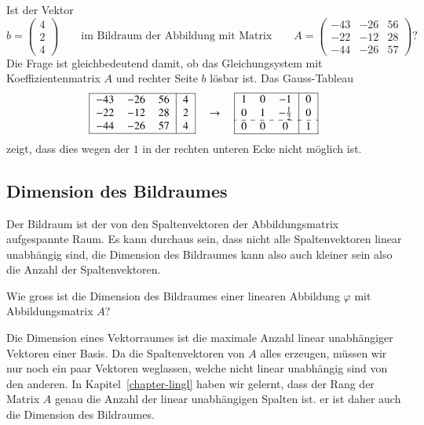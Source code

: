 \begin{beispiel}
Ist der Vektor
\[
b=\begin{pmatrix}4\\2\\4\end{pmatrix}
\qquad\text{im Bildraum der Abbildung mit Matrix}\qquad
A=
\begin{pmatrix}
  -43& -26&  56\\
  -22& -12&  28\\
  -44& -26&  57
\end{pmatrix}\text{?}
\]
Die Frage ist gleichbedeutend damit, ob das Gleichungsystem mit
Koeffizientenmatrix $A$ und rechter Seite $b$ lösbar ist.
Das Gauss-Tableau
\[
\begin{tabular}{|>{$}c<{$}>{$}c<{$}>{$}c<{$}|>{$}c<{$}|}
\hline
  -43& -26&  56&4\\
  -22& -12&  28&2\\
  -44& -26&  57&4\\
\hline
\end{tabular}
\quad\rightarrow\quad
\begin{tabular}{|>{$}c<{$}>{$}c<{$}>{$}c<{$}|>{$}c<{$}|}
\hline
   1&  0& -1&  0\\
   0&  1& -\frac12&   0\\
\hdashline
   0&  0&  0&  1\\
\hline
\end{tabular}
\]
zeigt, dass dies wegen der $1$ in der rechten unteren Ecke nicht möglich
ist.
\end{beispiel}

\subsection{Dimension des Bildraumes}
Der Bildraum ist der von den Spaltenvektoren der Abbildungsmatrix
aufgespannte Raum.
Es kann durchaus sein, dass nicht alle Spaltenvektoren linear unabhängig
sind, die Dimension des Bildraumes kann also auch kleiner sein also die
Anzahl der Spaltenvektoren.

\begin{aufgabe}
Wie gross ist die Dimension des Bildraumes einer linearen Abbildung
$\varphi$ mit Abbildungsmatrix $A$?
\end{aufgabe}
Die Dimension eines Vektorraumes ist die maximale Anzahl linear
unabhängiger Vektoren einer Basis.
Da die Spaltenvektoren von $A$ alles erzeugen, müssen wir nur noch
ein paar Vektoren weglassen, welche nicht linear unabhängig sind von
den anderen.
In Kapitel~\ref{chapter-lingl} haben wir gelernt, dass der Rang der
Matrix $A$ genau die Anzahl der linear unabhängigen Spalten ist.
er ist daher auch die Dimension des Bildraumes.

